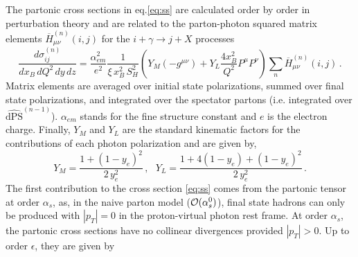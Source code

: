 \documentclass[superscriptaddress,showkeys,showpacs]{revtex4}
\begin{document}
The partonic cross sections in eq.\eqref{eq:ss} are calculated order by order 
in perturbation theory and are related to the parton-photon squared matrix 
elements 
$\overline{H}^{(n)}_{\mu\nu}(i,j)$ for the $i+\gamma\rightarrow j+X$ processes
\begin{equation}\label{eq:psigma}
\frac{d\sigma^{(n)}_{ij}}{dx_B\, dQ^2\,dy\,dz}=\frac{\alpha_{em}^2}{e^2}
        \frac{1}{\xi\,x_B^2\,S_H^2}
        \left(Y_M (-g^{\mu\nu})+Y_L \frac{4x_B^2}{Q^2}P^{\mu}P^{\nu}
        \right)\sum_{n}\overline{H}^{(n)}_{\mu\nu}(i,j)\, .
\end{equation} 
Matrix elements are averaged over initial state polarizations, summed
over final state polarizations, and integrated over the spectator partons 
(i.e. integrated
over $\widehat{\mbox{dPS}}^{(n-1)}$). 
$\alpha_{em}$ stands for the fine structure constant and 
$e$ is the electron charge. Finally, $Y_M$ and $Y_L$ are the standard 
kinematic factors for the contributions of each photon polarization and 
are given by,
\begin{equation}
Y_M=\frac{1+(1-y_e)^2}{2\,y_e^2}\,,\:\:\:Y_L=\frac{1+4(1-y_e)+(1-y_e)^2}{2\,y_e^2}\,.
\end{equation}
The first contribution to the cross section \eqref{eq:ss} comes from the partonic 
tensor
at order $\alpha_s$, as, in the naive parton model (${\cal{O}}(\alpha_s^0)$), final 
state 
hadrons can only be produced with $|p_T|=0$ in the proton-virtual photon rest frame. 
At order $\alpha_s$, the partonic cross sections have no collinear divergences 
provided $|p_T|>0$. Up to order $\epsilon$, they are 
given by 
\end{document}
